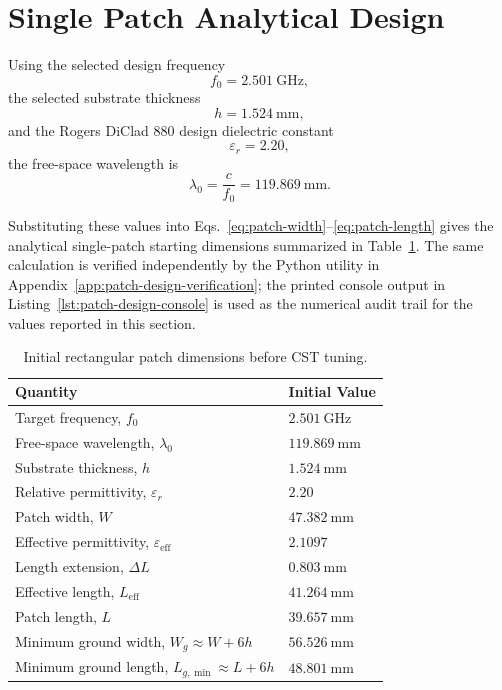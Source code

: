 \section{Single Patch Analytical Design}
\label{sec:single-patch-analytical-design}

Using the selected design frequency
\[
    f_0=2.501~\mathrm{GHz},
\]
the selected substrate thickness
\[
    h=1.524~\mathrm{mm},
\]
and the Rogers DiClad 880 design dielectric constant
\[
    \varepsilon_r=2.20,
\]
the free-space wavelength is
\begin{equation}
\lambda_0=\frac{c}{f_0}=119.869~\mathrm{mm}.
\end{equation}

Substituting these values into Eqs.~\eqref{eq:patch-width}--\eqref{eq:patch-length} gives the
analytical single-patch starting dimensions summarized in Table~\ref{tab:initial-patch-dimensions}.
The same calculation is verified independently by the Python utility in
Appendix~\ref{app:patch-design-verification}; the printed console output in
Listing~\ref{lst:patch-design-console} is used as the numerical audit trail for the values reported in
this section.

\begin{table}[H]
\centering
\caption{Initial rectangular patch dimensions before CST tuning.}
\label{tab:initial-patch-dimensions}
\begin{tabular}{@{}ll@{}}
\toprule
\textbf{Quantity} & \textbf{Initial Value} \\
\midrule
Target frequency, \(f_0\) & \(2.501~\mathrm{GHz}\) \\
Free-space wavelength, \(\lambda_0\) & \(119.869~\mathrm{mm}\) \\
Substrate thickness, \(h\) & \(1.524~\mathrm{mm}\) \\
Relative permittivity, \(\varepsilon_r\) & \(2.20\) \\
Patch width, \(W\) & \(47.382~\mathrm{mm}\) \\
Effective permittivity, \(\varepsilon_{\mathrm{eff}}\) & \(2.1097\) \\
Length extension, \(\Delta L\) & \(0.803~\mathrm{mm}\) \\
Effective length, \(L_{\mathrm{eff}}\) & \(41.264~\mathrm{mm}\) \\
Patch length, \(L\) & \(39.657~\mathrm{mm}\) \\
Minimum ground width, \(W_g\approx W+6h\) & \(56.526~\mathrm{mm}\) \\
Minimum ground length, \(L_{g,\min}\approx L+6h\) & \(48.801~\mathrm{mm}\) \\
\bottomrule
\end{tabular}
\end{table}

